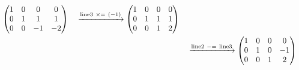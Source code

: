 \documentclass{ltjsarticle}
\begin{document}
\begin{align*}
\begin{pmatrix}
 1 & 0 & 0 & 0\\
 0 & 1 & 1 & 1\\
 0 & 0 & -1 & - 2
\end{pmatrix}\ \ \ \xrightarrow{ \text{line} 3 \ \times=\ \left( - 1 \right)} %
\begin{pmatrix}
 1 & 0 & 0 & 0\\
 0 & 1 & 1 & 1\\
 0 & 0 & 1 & 2
\end{pmatrix}\allowdisplaybreaks\\
 &\ \ \ \xrightarrow{ \text{line} 2 \ -=\  \text{line} 3 } %
\begin{pmatrix}
 1 & 0 & 0 & 0\\
 0 & 1 & 0 & -1\\
 0 & 0 & 1 & 2
\end{pmatrix}
\end{align*}
\end{document}
